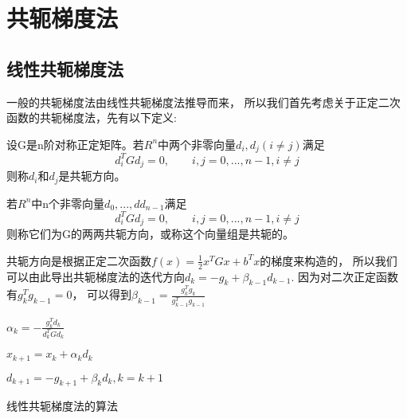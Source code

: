                        
\section{共轭梯度法}
    \subsection{线性共轭梯度法}
        一般的共轭梯度法由线性共轭梯度法推导而来，
        所以我们首先考虑关于正定二次函数的共轭梯度法，先有以下定义:
        
        设G是n阶对称正定矩阵。若$R^n$中两个非零向量$d_i,d_j(i\not=j)$满足
        \begin{equation}
            d_i^TGd_j=0,\quad\quad i,j=0,...,n-1,i\not=j
        \end{equation}则称$d_i$和$d_j$是共轭方向。
    
        若$R^n$中n个非零向量$d_0,...,dd_{n-1}$满足
        \begin{equation}
            d_i^TGd_j=0,\quad\quad i,j=0,...,n-1,i\not=j
        \end{equation}则称它们为G的两两共轭方向，或称这个向量组是共轭的。

        共轭方向是根据正定二次函数$f(x)=\frac{1}{2}x^TGx+b^Tx$的梯度来构造的，
        所以我们可以由此导出共轭梯度法的迭代方向$d_k=-g_k+\beta_{k-1}d_{k-1}$.
        因为对二次正定函数有$g_k^Tg_{k-1}=0$，
        可以得到$\beta_{k-1}=\displaystyle\frac{g_k^Tg_k}{g_{k-1}^Tg_{k-1}}$
    
        
        
        
               
        \begin{algorithm}
        
            \SetAlgoLined
        
             {
                $\alpha_k=-\displaystyle\frac{g_k^Td_k}{d_k^TGd_k}$
                
                $x_{k+1}=x_k+\alpha_kd_k$
                
                $d_{k+1}=-g_{k+1}+\beta_kd_k,k=k+1$
            }
            \caption{线性共轭梯度法的算法}
        \end{algorithm}
               

